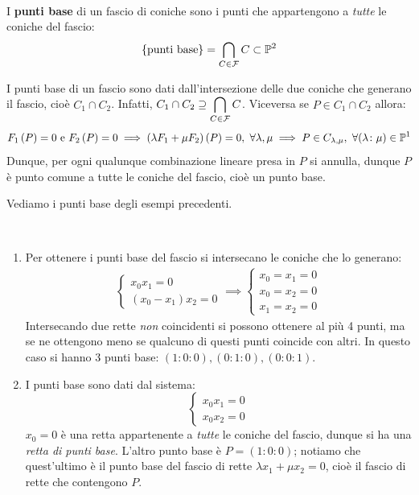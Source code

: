 \begin{define}~{}\\
	I \textbf{punti base} di un fascio di coniche sono i punti che appartengono a \textit{tutte} le coniche del fascio:
		\begin{equation}
			\{\text{punti base}\}=\inter_{C\in\mathcal{F}} C \subset \proj[2]{\ }
		\end{equation}
	\vspace{-3mm}
\end{define}
\begin{observe}	I punti base di un fascio sono dati dall'intersezione delle due coniche che generano il fascio, cioè $C_1\cap C_2$. Infatti, $\displaystyle C_1\cap C_2 \supseteq \mathop{{\bigcap}}\displaylimits_{C\in\mathcal{F}} C$. Viceversa se $P\in C_1\cap C_2$ allora:
	\begin{equation*}
		F_1\left(P\right)=0\text{ e }F_2\left(P\right)=0 \implies (\lambda F_1 +\mu F_2)\left(P\right)=0,\ \forall\lambda,\mu \implies P\in C_{\lambda,\mu},\ \forall (\lambda\colon\mu)\in\proj[1]{\ }
	\end{equation*}
Dunque, per ogni qualunque combinazione lineare presa in $P$ si annulla, dunque $P$ è punto comune a tutte le coniche del fascio, cioè un punto base.
\end{observe}
Vediamo i punti base degli esempi precedenti.
\begin{examples}~{}
	\begin{enumerate}
		\item	Per ottenere i punti base del fascio si intersecano le coniche che lo generano:
			\begin{gather*}
				\begin{cases}
					x_0x_1=0\\
					(x_0-x_1)x_2=0
				\end{cases} \implies \begin{cases}
					x_0=x_1=0\\
					x_0=x_2=0\\
					x_1=x_2=0
				\end{cases}
			\end{gather*}
		Intersecando due rette \textit{non} coincidenti si possono ottenere al più 4 punti, ma se ne ottengono meno se qualcuno di questi punti coincide con altri. In questo caso si hanno 3 punti base: $(1\colon 0\colon 0),(0\colon 1\colon 0), (0\colon 0\colon 1)$.
		\item	I punti base sono dati dal sistema:
		\begin{equation*}
			\begin{cases} x_0x_1=0\\ x_0x_2=0 \end{cases}
		\end{equation*}
		$x_0=0$ è una retta appartenente a \textit{tutte} le coniche del fascio, dunque si ha una \textit{retta di punti base}. L'altro punto base è $P=(1\colon 0\colon 0)$; notiamo che quest'ultimo è il punto base del fascio di rette $\lambda x_1+\mu x_2=0$, cioè il fascio di rette che contengono $P$.
	\end{enumerate}
\end{examples}
